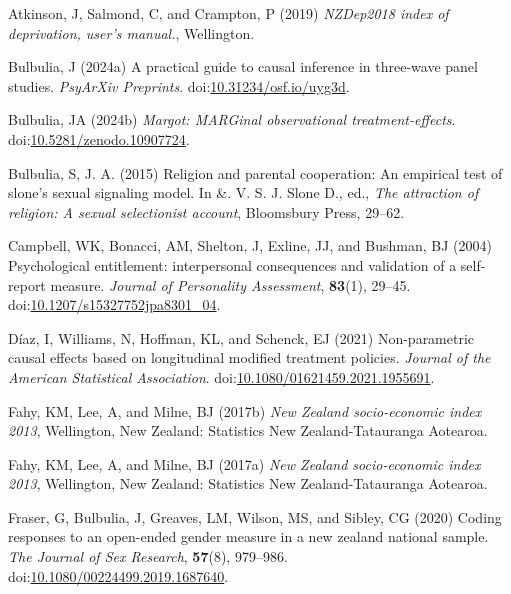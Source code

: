 \documentclass[
  singlecolumn]{article}
\newlength{\cslhangindent}
\newenvironment{CSLReferences}[2] %
 {\begin{list}{}{%
  \setlength{\itemindent}{0pt}
  \setlength{\leftmargin}{0pt}
  \setlength{\parsep}{0pt}
  \ifodd #1
   \setlength{\leftmargin}{\cslhangindent}
   \setlength{\itemindent}{-1\cslhangindent}
  \fi
  \setlength{\itemsep}{#2\baselineskip}}}
 {\end{list}}
\begin{document}
\label{refs}
\begin{CSLReferences}{1}{0}
Atkinson, J, Salmond, C, and Crampton, P (2019) \emph{NZDep2018 index of
deprivation, user{'}s manual.}, Wellington.

Bulbulia, J (2024a) A practical guide to causal inference in three-wave
panel studies. \emph{PsyArXiv Preprints}.
doi:\href{https://doi.org/10.31234/osf.io/uyg3d}{10.31234/osf.io/uyg3d}.

Bulbulia, JA (2024b) \emph{Margot: MARGinal observational
treatment-effects}.
doi:\href{https://doi.org/10.5281/zenodo.10907724}{10.5281/zenodo.10907724}.

Bulbulia, S, J. A. (2015) Religion and parental cooperation: An
empirical test of slone's sexual signaling model. In \&. V. S. J. Slone
D., ed., \emph{The attraction of religion: A sexual selectionist
account}, Bloomsbury Press, 29--62.

Campbell, WK, Bonacci, AM, Shelton, J, Exline, JJ, and Bushman, BJ
(2004) Psychological entitlement: interpersonal consequences and
validation of a self-report measure. \emph{Journal of Personality
Assessment}, \textbf{83}(1), 29--45.
doi:\href{https://doi.org/10.1207/s15327752jpa8301_04}{10.1207/s15327752jpa8301\_04}.

Díaz, I, Williams, N, Hoffman, KL, and Schenck, EJ (2021) Non-parametric
causal effects based on longitudinal modified treatment policies.
\emph{Journal of the American Statistical Association}.
doi:\href{https://doi.org/10.1080/01621459.2021.1955691}{10.1080/01621459.2021.1955691}.

Fahy, KM, Lee, A, and Milne, BJ (2017b) \emph{New Zealand socio-economic
index 2013}, Wellington, New Zealand: Statistics New Zealand-Tatauranga
Aotearoa.

Fahy, KM, Lee, A, and Milne, BJ (2017a) \emph{New Zealand socio-economic
index 2013}, Wellington, New Zealand: Statistics New Zealand-Tatauranga
Aotearoa.

Fraser, G, Bulbulia, J, Greaves, LM, Wilson, MS, and Sibley, CG (2020)
Coding responses to an open-ended gender measure in a new zealand
national sample. \emph{The Journal of Sex Research}, \textbf{57}(8),
979--986.
doi:\href{https://doi.org/10.1080/00224499.2019.1687640}{10.1080/00224499.2019.1687640}.


\end{CSLReferences}
\end{document}
